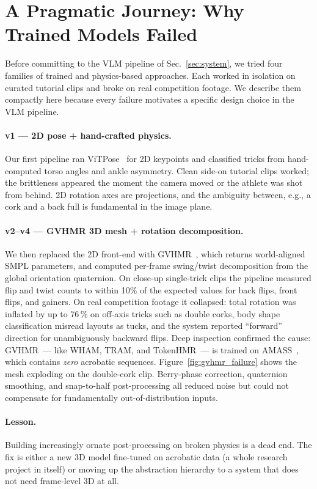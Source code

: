 \section{A Pragmatic Journey: Why Trained Models Failed}
\label{sec:journey}

Before committing to the VLM pipeline of Sec.~\ref{sec:system}, we tried
four families of trained and physics-based approaches. Each worked in
isolation on curated tutorial clips and broke on real competition footage.
We describe them compactly here because every failure motivates a specific
design choice in the VLM pipeline.

\paragraph{v1 --- 2D pose + hand-crafted physics.}
Our first pipeline ran ViTPose~\cite{xu2022vitpose} for 2D keypoints and
classified tricks from hand-computed torso angles and ankle asymmetry.
Clean side-on tutorial clips worked; the brittleness appeared the moment
the camera moved or the athlete was shot from behind. 2D rotation axes are
projections, and the ambiguity between, e.g., a cork and a back full is
fundamental in the image plane.

\paragraph{v2--v4 --- GVHMR 3D mesh + rotation decomposition.}
We then replaced the 2D front-end with GVHMR~\cite{shen2024gvhmr}, which
returns world-aligned SMPL parameters, and computed per-frame swing/twist
decomposition from the global orientation quaternion. On close-up single-trick
clips the pipeline measured flip and twist counts to within 10\% of the
expected values for back flips, front flips, and gainers. On real
competition footage it collapsed: total rotation was inflated by up to
76\,\% on off-axis tricks such as double corks, body shape classification
misread layouts as tucks, and the system reported ``forward'' direction for
unambiguously backward flips. Deep inspection confirmed the cause:
GVHMR~--- like WHAM, TRAM, and TokenHMR~--- is trained on
AMASS~\cite{mahmood2019amass}, which contains \emph{zero} acrobatic
sequences. Figure~\ref{fig:gvhmr_failure} shows the mesh exploding on the
double-cork clip.  Berry-phase correction, quaternion smoothing, and
snap-to-half post-processing all reduced noise but could not compensate for
fundamentally out-of-distribution inputs.

\paragraph{Lesson.} Building increasingly ornate post-processing on broken
physics is a dead end. The fix is either a new 3D model fine-tuned on
acrobatic data (a whole research project in itself) or moving up the
abstraction hierarchy to a system that does not need frame-level 3D at all.

